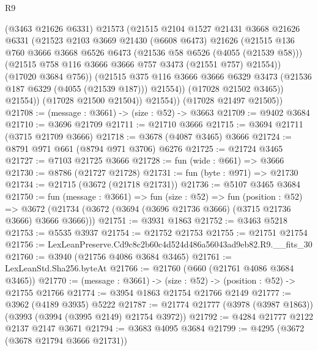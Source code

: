 \begin{lexlean}{R9}
\begin{coremodule}
                  (@3463 @21626 @6331)
                  @21573
                  (@21515
                    @2104
                    @1527
                    @21431
                    @3668
                    @21626
                    @6331
                    (@21523
                      @2103
                      @3669
                      @21430
                      (@6608 @6473)
                      @21626
                      (@21515
                        @136
                        @760
                        @3666
                        @3668
                        @6526
                        @6473
                        (@21536 @58 @6526 (@4055 (@21539 @58)))
                        (@21515 @758 @116 @3666 @3666 @757 @3473 (@21551 @757) @21554))
                      (@17020 @3684 @756))
                    (@21515
                      @375
                      @116
                      @3666
                      @3666
                      @6329
                      @3473
                      (@21536 @187 @6329 (@4055 (@21539 @187)))
                      @21554))
                  (@17028 @21502 @3465))
                @21554))
            (@17028 @21500 @21504))
          @21554))
      (@17028 @21497 @21505))
@21708 := (message : @3661) -> (size : @52) -> @3663
@21709 := @9402 @3684
@21710 := @3696 @21709
@21711 := @21710 @3666
@21715 := @3694 @21711 (@3715 @21709 @3666)
@21718 := @3678 (@4087 @3465) @3666
@21724 := @8791 @971 @661 (@8794 @971 @3706) @6276
@21725 := @21724 @3465
@21727 := @7103 @21725 @3666
@21728 := fun (wide : @661) => @3666
@21730 := @8786 (@21727 @21728)
@21731 := fun (byte : @971) => @21730
@21734 := @21715 (@3672 (@21718 @21731))
@21736 := @5107 @3465 @3684
@21750 := fun (message : @3661) =>
  fun (size : @52) =>
  fun (position : @52) =>
  @3672 (@21734 (@3672 (@3694 (@3696 @21736 @3666) (@3715 @21736 @3666) @3666 @3666)))
@21751 := @3931 @1863
@21752 := @3463 @5218
@21753 := @5535 @3937
@21754 := @21752 @21753
@21755 := @21751 @21754
@21756 := LexLeanPreserve.Cd9c8c2b60c4d524d486a56043ad9eb82.R9.__fits_30
@21760 := @3940 (@21756 @4086 @3684 @3465)
@21761 := LexLeanStd.Sha256.byteAt
@21766 := @21760 (@660 (@21761 @4086 @3684 @3465))
@21770 := (message : @3661) -> (size : @52) -> (position : @52) -> @21755 @21766
@21774 := @3954 @1863 @21754 @21766 @2149
@21777 := @3962 (@4189 @3935) @5222
@21787 := @21774 @21777 (@3978 (@3987 @1863)) (@3993 (@3994 (@3995 @2149) @21754 @3972))
@21792 := @4284 @21777 @2122 @2137 @2147 @3671
@21794 := @3683 @4095 @3684
@21799 := @4295 (@3672 (@3678 @21794 @3666 @21731))

\end{coremodule}
\end{lexlean}
